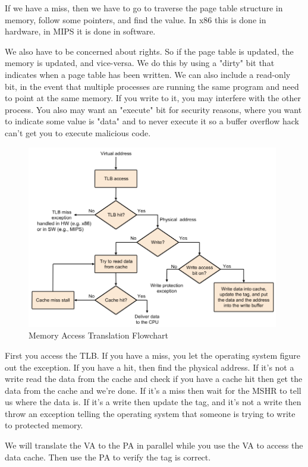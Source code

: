 \documentclass{article}
\begin{document}
If we have a miss, then we have to go to traverse the page table structure in memory, follow some pointers, and find the value. In x86 this is done in hardware, in MIPS it is done in software.

We also have to be concerned about rights. So if the page table is updated, the memory is updated, and vice-versa. We do this by using a "dirty" bit that indicates when a page table has been written. We can also include a read-only bit, in the event that multiple processes are running the same program and need to point at the same memory. If you write to it, you may interfere with the other process. You also may want an "execute" bit for security reasons, where you want to indicate some value is "data" and to never execute it so a buffer overflow hack can't get you to execute malicious code.


\begin{figure}[ht!]
\centering
\includegraphics[width=110mm]{img/flow.png}
\caption{Memory Access Translation Flowchart}
\end{figure}

First you access the TLB. If you have a miss, you let the operating system figure out the exception. If you have a hit, then find the physical address.  If it's not a write read the data from the cache and check if you have a cache hit then get the data from the cache and we're done. If it's a miss then wait for the MSHR to tell us where the data is. If it's a write then update the tag, and it's not a write then throw an exception telling the operating system that someone is trying to write to protected memory.

We will translate the VA to the PA in parallel while you use the VA to access the data cache. Then use the PA to verify the tag is correct. 
\end{document}
